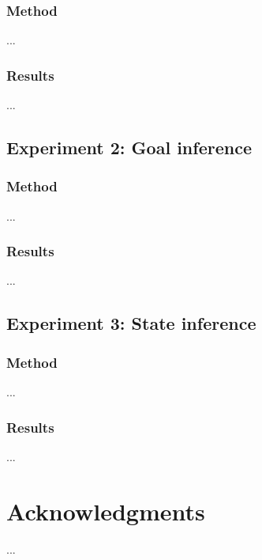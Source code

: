 \documentclass[10pt,letterpaper]{article}
\begin{document}
\subsubsection{Method}

...

\subsubsection{Results}

...

\subsection{Experiment 2: Goal inference}

\subsubsection{Method}

...

\subsubsection{Results}

...

\subsection{Experiment 3: State inference}

\subsubsection{Method}

...

\subsubsection{Results}

...


\section{Acknowledgments}

...



\setlength{\bibleftmargin}{.125in}
\setlength{\bibindent}{-\bibleftmargin}


\end{document}
